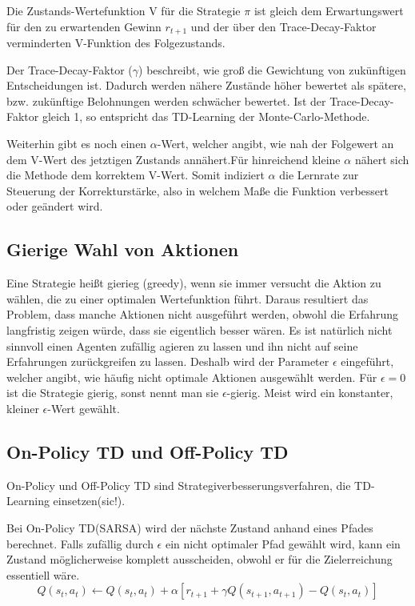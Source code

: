 \documentclass[10pt]{scrartcl}
\begin{document}
Die Zustands-Wertefunktion V für die Strategie $\pi$ ist gleich dem Erwartungswert für den zu erwartenden Gewinn $r_{t+1}$ und der über den Trace-Decay-Faktor verminderten V-Funktion des Folgezustands.

Der Trace-Decay-Faktor ($\gamma$) beschreibt, wie groß die Gewichtung von zukünftigen Entscheidungen ist. Dadurch werden nähere Zustände höher bewertet als spätere, bzw. zukünftige Belohnungen werden schwächer bewertet. Ist der Trace-Decay-Faktor  gleich 1, so entspricht das TD-Learning der Monte-Carlo-Methode.

Weiterhin gibt es noch einen $\alpha$-Wert, welcher angibt, wie nah der Folgewert an dem V-Wert des jetztigen Zustands annähert.Für hinreichend kleine $\alpha$ nähert sich die Methode dem korrektem V-Wert. Somit indiziert $\alpha$ die Lernrate zur Steuerung der Korrekturstärke, also in welchem Maße die Funktion verbessert oder geändert wird.

\subsection{Gierige Wahl von Aktionen}
Eine Strategie heißt gierieg (greedy), wenn sie immer versucht die Aktion zu wählen, die zu einer optimalen Wertefunktion führt. Daraus resultiert das Problem, dass manche Aktionen nicht ausgeführt werden, obwohl die Erfahrung langfristig zeigen würde, dass sie eigentlich besser wären. 
Es ist natürlich nicht sinnvoll einen Agenten zufällig agieren zu lassen und ihn nicht auf seine Erfahrungen zurückgreifen zu lassen. Deshalb wird der Parameter $\epsilon$ eingeführt, welcher angibt, wie häufig nicht optimale Aktionen ausgewählt werden. Für $\epsilon = 0$ ist die Strategie gierig, sonst nennt man sie $\epsilon$-gierig. Meist wird ein konstanter, kleiner $\epsilon$-Wert gewählt. 

\subsection{On-Policy TD und Off-Policy TD}
On-Policy und Off-Policy TD sind Strategiverbesserungsverfahren, die TD-Learning einsetzen(sic!).

Bei On-Policy TD(SARSA) wird der nächste Zustand anhand eines Pfades berechnet. Falls zufällig durch $\epsilon$ ein nicht optimaler Pfad gewählt wird, kann ein Zustand möglicherweise komplett ausscheiden, obwohl er für die Zielerreichung essentiell wäre. 
\begin{equation}
Q(s_t,a_t) \leftarrow Q(s_t,a_t) + \alpha[r_{t+1}+\gamma Q(s_{t+1},a_{t+1})- Q(s_t,a_t)]
\end{equation}
\end{document}
